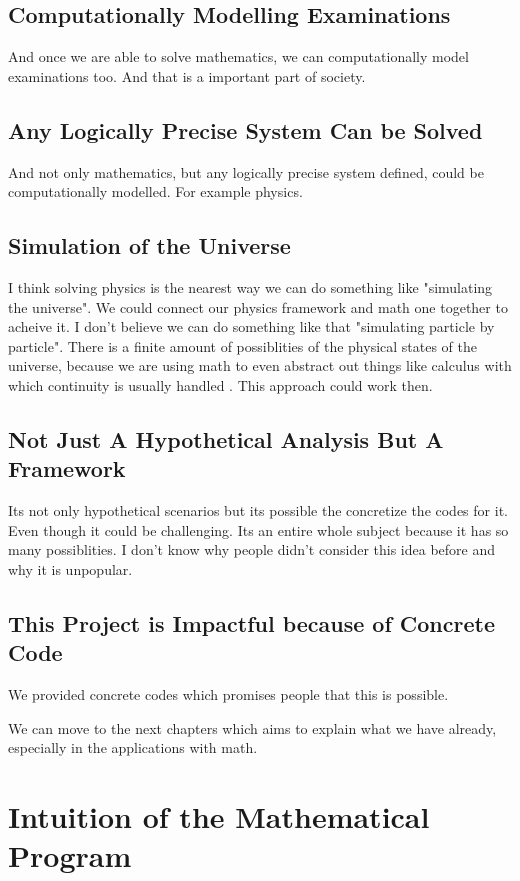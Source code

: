 \documentclass{book}
\begin{document}
\section{Computationally Modelling Examinations}
And once we are able to solve mathematics, we can computationally model examinations too. And that is a important part of society.

\section{Any Logically Precise System Can be Solved}
And not only mathematics, but any logically precise system defined, could be computationally modelled. For example physics.

\section{Simulation of the Universe}
I think solving physics is the nearest way we can do something like "simulating the universe". We could connect our physics framework and math one together to acheive it. I don't believe we can do something like that "simulating particle by particle".  There is a finite amount of possiblities of the physical states of the universe, because we are using math to even abstract out things like calculus with which continuity is usually handled . This approach could work then.

\section{Not Just A Hypothetical Analysis But A Framework}
Its not only hypothetical scenarios but its possible the concretize the codes for it. Even though it could be challenging. Its an entire whole subject because it has so many possiblities. I don't know why people didn't consider this idea before and why it is unpopular.

\section{This Project is Impactful because of Concrete Code}
We provided concrete codes which promises people that this is possible. 

We can move to the next chapters which aims to explain what we have already, especially in the applications with math.

\chapter{Intuition of the Mathematical Program}
\end{document}
